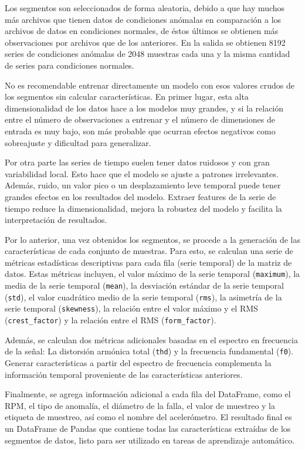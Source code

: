 \documentclass[11pt,a4paper,spanish]{book}
\numberwithin{equation}{chapter}
\numberwithin{figure}{chapter}
\begin{document}
Los segmentos son seleccionados de forma aleatoria, debido a que hay muchos más archivos 
que tienen datos de condiciones anómalas en comparación a los archivos de datos en 
condiciones normales, de éstos últimos se obtienen más observaciones por archivos que 
de los anteriores. En la salida se obtienen 8192 series de condiciones anómalas de 2048 
muestras cada una y la misma cantidad de series para condiciones normales. 


No es recomendable entrenar directamente un modelo con esos valores crudos de los 
segmentos sin calcular características. En primer lugar, esta alta dimensionalidad de 
los datos hace a los modelos muy grandes, y si la relación entre el número de 
observaciones a entrenar y el número de dimensiones de entrada es muy bajo, son más 
probable que ocurran  efectos negativos como sobreajuste y dificultad para generalizar. 


Por otra parte las series de tiempo suelen tener datos ruidosos y con gran variabilidad 
local. Esto hace que el modelo se ajuste a patrones irrelevantes.  Además, ruido, un 
valor pico o un desplazamiento leve temporal puede tener grandes efectos en los 
resultados del modelo. Extraer features de la serie de tiempo reduce la dimensionalidad, 
mejora la robustez del modelo y facilita la interpretación de resultados. 


Por lo anterior, una vez obtenidos los segmentos, se procede a la generación de las 
características de cada conjunto de muestras. Para esto, se calculan una serie de 
métricas estadísticas descriptivas para cada fila (serie temporal) de la matriz de 
datos. Estas métricas incluyen, el valor máximo de la serie temporal (\texttt{maximum}),
la media de la serie temporal (\texttt{mean}), la desviación estándar de la serie
temporal (\texttt{std}), el valor cuadrático medio de la serie temporal (\texttt{rms}),
la asimetría de la serie temporal (\texttt{skewness}), la relación entre el valor máximo 
y el RMS (\texttt{crest\_factor}) y la relación entre el RMS (\texttt{form\_factor}).

Además, se calculan dos métricas adicionales basadas en el espectro en frecuencia de la señal:
La distorsión armónica total (\texttt{thd}) y la frecuencia fundamental (\texttt{f0}).
Generar características a partir del espectro de frecuencia complementa la información
temporal proveniente de las características anteriores. 


Finalmente, se agrega información adicional a cada fila del DataFrame, como el RPM, el 
tipo de anomalía, el diámetro de la falla, el valor de muestreo y la etiqueta de 
muestreo, así como el nombre del acelerómetro. El resultado final es un DataFrame de 
Pandas que contiene todas las características extraídas de los segmentos de datos, 
listo para ser utilizado en tareas de aprendizaje automático.
\end{document}

